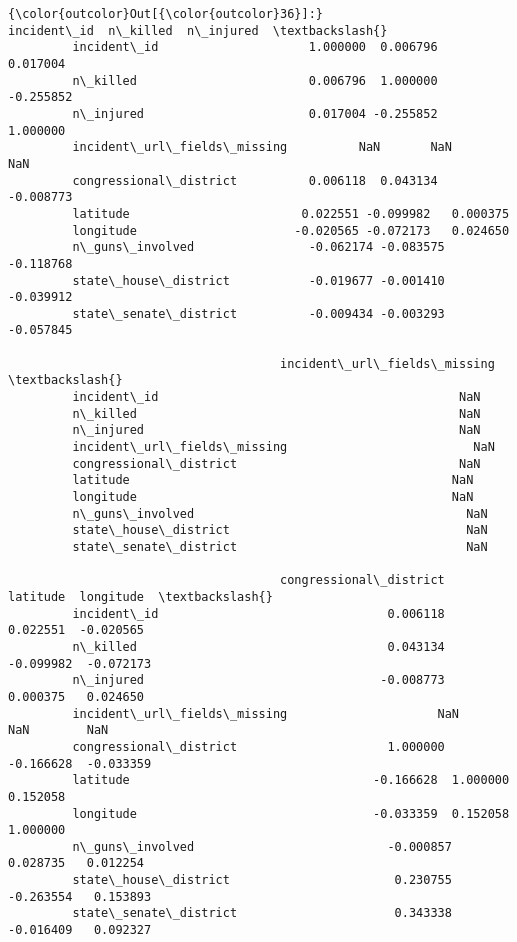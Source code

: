 \documentclass[11pt]{article}
\begin{document}
\begin{Verbatim}[commandchars=\\\{\}]
{\color{outcolor}Out[{\color{outcolor}36}]:}                              incident\_id  n\_killed  n\_injured  \textbackslash{}
         incident\_id                     1.000000  0.006796   0.017004   
         n\_killed                        0.006796  1.000000  -0.255852   
         n\_injured                       0.017004 -0.255852   1.000000   
         incident\_url\_fields\_missing          NaN       NaN        NaN   
         congressional\_district          0.006118  0.043134  -0.008773   
         latitude                        0.022551 -0.099982   0.000375   
         longitude                      -0.020565 -0.072173   0.024650   
         n\_guns\_involved                -0.062174 -0.083575  -0.118768   
         state\_house\_district           -0.019677 -0.001410  -0.039912   
         state\_senate\_district          -0.009434 -0.003293  -0.057845   
         
                                      incident\_url\_fields\_missing  \textbackslash{}
         incident\_id                                          NaN   
         n\_killed                                             NaN   
         n\_injured                                            NaN   
         incident\_url\_fields\_missing                          NaN   
         congressional\_district                               NaN   
         latitude                                             NaN   
         longitude                                            NaN   
         n\_guns\_involved                                      NaN   
         state\_house\_district                                 NaN   
         state\_senate\_district                                NaN   
         
                                      congressional\_district  latitude  longitude  \textbackslash{}
         incident\_id                                0.006118  0.022551  -0.020565   
         n\_killed                                   0.043134 -0.099982  -0.072173   
         n\_injured                                 -0.008773  0.000375   0.024650   
         incident\_url\_fields\_missing                     NaN       NaN        NaN   
         congressional\_district                     1.000000 -0.166628  -0.033359   
         latitude                                  -0.166628  1.000000   0.152058   
         longitude                                 -0.033359  0.152058   1.000000   
         n\_guns\_involved                           -0.000857  0.028735   0.012254   
         state\_house\_district                       0.230755 -0.263554   0.153893   
         state\_senate\_district                      0.343338 -0.016409   0.092327   
         

\end{Verbatim}
\end{document}
